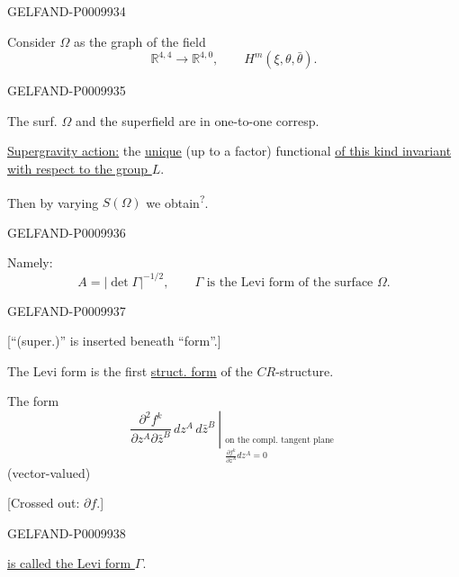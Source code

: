 \begin{GelfandAdjacentEvidence}{GELFAND-P000993}{4}


Consider $\Omega$ as the graph of the field
\[
\mathbb R^{4,4}\longrightarrow\mathbb R^{4,0},\qquad
H^m(\xi,\theta,\bar\theta).
\]
\end{GelfandAdjacentEvidence}
\begin{GelfandAdjacentEvidence}{GELFAND-P000993}{5}


The surf. $\Omega$ and the superfield are in one-to-one corresp.

\underline{Supergravity action:} the \underline{unique} (up to a factor) functional \underline{of this kind invariant with respect to the group $L$}.

Then by varying $S(\Omega)$ we obtain\textsuperscript{?}.
\end{GelfandAdjacentEvidence}
\begin{GelfandAdjacentEvidence}{GELFAND-P000993}{6}


Namely:
\[
A=|\det\Gamma|^{-1/2},\qquad
\Gamma\text{ is the Levi form of the surface }\Omega.
\]
\end{GelfandAdjacentEvidence}
\begin{GelfandAdjacentEvidence}{GELFAND-P000993}{7}


[“(super.)” is inserted beneath “form”.]

The Levi form is the first \underline{struct. form} of the $CR$-structure.

The form
\[
\left.
\frac{\partial^2 f^k}{\partial z^A\partial\bar z^B}\,
dz^A\,d\bar z^B
\ \right|_{\substack{\text{on the compl. tangent plane}\\
 \frac{\partial f^k}{\partial z^A}dz^A=0}}
\]
(vector-valued)

[Crossed out: $\partial f$.]
\end{GelfandAdjacentEvidence}
\begin{GelfandAdjacentEvidence}{GELFAND-P000993}{8}


\underline{is called the Levi form $\Gamma$}.

\end{GelfandAdjacentEvidence}


